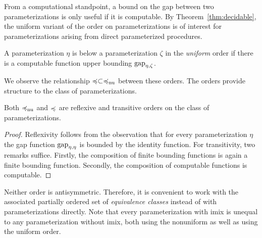 From a computational standpoint, a bound on the gap between two parameterizations is only useful if it is computable.
By Theorem~\ref{thm:decidable}, the uniform variant of the order on parameterizations is of interest for parameterizations arising from direct parameterized procedures.

\begin{definition}
  A parameterization $\eta$ is below a parameterization $\zeta$ in the \emph{uniform} order  if there is a computable function upper bounding $\operatorname{gap}_{\eta, \zeta}$.
\end{definition}

We observe the relationship $\preccurlyeq \subset \preccurlyeq_\mathrm{nu}$ between these orders.
The orders provide structure to the class of parameterizations.
\begin{lemma}
\label{lem:preorder}
  Both $\preccurlyeq_\mathrm{nu}$ and $\preccurlyeq$ are reflexive and transitive orders on the class of parameterizations.
\end{lemma}
\begin{proof}
  Reflexivity follows from the observation that for every parameterization $\eta$ the gap function $\operatorname{gap}_{\eta, \eta}$ is bounded by the identity function.
  For transitivity, two remarks suffice.
  Firstly, the composition of finite bounding functions is again a finite bounding function.
  Secondly, the composition of computable functions is computable.
\end{proof}

Neither order is antisymmetric.
Therefore, it is convenient to work with the associated partially ordered set of \emph{equivalence classes} instead of with parameterizations directly.
Note that every parameterization with imix is unequal to any parameterization without imix, both using the nonuniform as well as using the uniform order.

